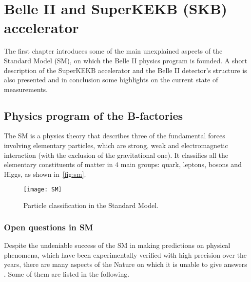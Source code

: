
\chapter{Belle II and SuperKEKB (SKB) accelerator}\label{ch:BelleII}

The first chapter introduces some of the main unexplained aspects of the Standard Model (SM), on which the Belle II physics program is founded. A short description of the SuperKEKB accelerator and the Belle II detector's structure is also presented and in conclusion some highlights on the current state of measurements.


\section{Physics program of the B-factories}

The SM is a physics theory that describes three of the fundamental forces involving elementary particles, which are strong, weak and electromagnetic interaction (with the exclusion of the gravitational one). It classifies all the elementary constituents of matter in 4 main groups: quark, leptons, bosons and Higgs, as shown in~\autoref{fig:sm}.


\begin{figure}[h]
\centering
\texttt{[image: SM]}
\caption{Particle classification in the Standard Model.}
\label{fig:sm}
\end{figure}




\subsection{Open questions in SM}


Despite the undeniable success of the SM in making predictions on physical phenomena, which have been experimentally verified with high precision over the years, there are many aspects of the Nature on which it is unable to give answers \cite{physics_book}. Some of them are listed in the following.

